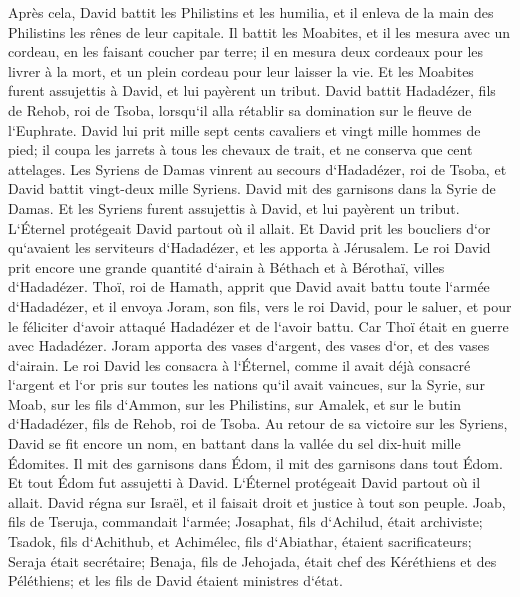 \verse Après cela, David battit les Philistins et les humilia, et il enleva de la main des Philistins les rênes de leur capitale. 
\verse Il battit les Moabites, et il les mesura avec un cordeau, en les faisant coucher par terre; il en mesura deux cordeaux pour les livrer à la mort, et un plein cordeau pour leur laisser la vie. Et les Moabites furent assujettis à David, et lui payèrent un tribut. 
\verse David battit Hadadézer, fils de Rehob, roi de Tsoba, lorsqu`il alla rétablir sa domination sur le fleuve de l`Euphrate. 
\verse David lui prit mille sept cents cavaliers et vingt mille hommes de pied; il coupa les jarrets à tous les chevaux de trait, et ne conserva que cent attelages. 
\verse Les Syriens de Damas vinrent au secours d`Hadadézer, roi de Tsoba, et David battit vingt-deux mille Syriens. 
\verse David mit des garnisons dans la Syrie de Damas. Et les Syriens furent assujettis à David, et lui payèrent un tribut. L`Éternel protégeait David partout où il allait. 
\verse Et David prit les boucliers d`or qu`avaient les serviteurs d`Hadadézer, et les apporta à Jérusalem. 
\verse Le roi David prit encore une grande quantité d`airain à Béthach et à Bérothaï, villes d`Hadadézer. 
\verse Thoï, roi de Hamath, apprit que David avait battu toute l`armée d`Hadadézer, 
\verse et il envoya Joram, son fils, vers le roi David, pour le saluer, et pour le féliciter d`avoir attaqué Hadadézer et de l`avoir battu. Car Thoï était en guerre avec Hadadézer. Joram apporta des vases d`argent, des vases d`or, et des vases d`airain. 
\verse Le roi David les consacra à l`Éternel, comme il avait déjà consacré l`argent et l`or pris sur toutes les nations qu`il avait vaincues, 
\verse sur la Syrie, sur Moab, sur les fils d`Ammon, sur les Philistins, sur Amalek, et sur le butin d`Hadadézer, fils de Rehob, roi de Tsoba. 
\verse Au retour de sa victoire sur les Syriens, David se fit encore un nom, en battant dans la vallée du sel dix-huit mille Édomites. 
\verse Il mit des garnisons dans Édom, il mit des garnisons dans tout Édom. Et tout Édom fut assujetti à David. L`Éternel protégeait David partout où il allait. 
\verse David régna sur Israël, et il faisait droit et justice à tout son peuple. 
\verse Joab, fils de Tseruja, commandait l`armée; Josaphat, fils d`Achilud, était archiviste; 
\verse Tsadok, fils d`Achithub, et Achimélec, fils d`Abiathar, étaient sacrificateurs; Seraja était secrétaire; 
\verse Benaja, fils de Jehojada, était chef des Kéréthiens et des Péléthiens; et les fils de David étaient ministres d`état. 

